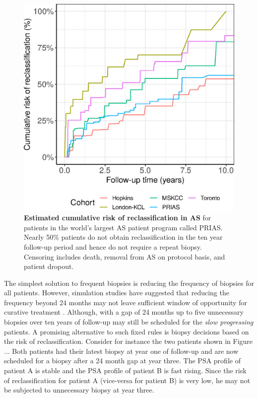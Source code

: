 \begin{figure}[!htb]
\centerline{\includegraphics[width=\columnwidth]{images/npmle_plot.eps}}
\caption{\textbf{Estimated cumulative risk of reclassification in AS} for patients in the world's largest AS patient program called PRIAS. Nearly 50\% patients do not obtain reclassification in the ten year follow-up period and hence do not require a repeat biopsy. Censoring includes death, removal from AS on protocol basis, and patient dropout.}
\label{fig:npmle_plot}
\end{figure}

The simplest solution to frequent biopsies is reducing the frequency of biopsies for all patients. However, simulation studies have suggested that reducing the frequency beyond 24 months may not leave sufficient window of opportunity for curative treatment \citep{inoue2018comparative}. Although, with a gap of 24 months up to five unnecessary biopsies over ten years of follow-up may still be scheduled for the \textit{slow progressing} patients. A promising alternative to such fixed rules is biopsy decisions based on the risk of reclassification. Consider for instance the two patients shown in Figure ... Both patients had their latest biopsy at year one of follow-up and are now scheduled for a biopsy after a 24 month gap at year three. The PSA profile of patient A is stable and the PSA profile of patient B is fast rising. Since the risk of reclassification for patient A (vice-versa for patient B) is very low, he may not be subjected to unnecessary biopsy at year three.

